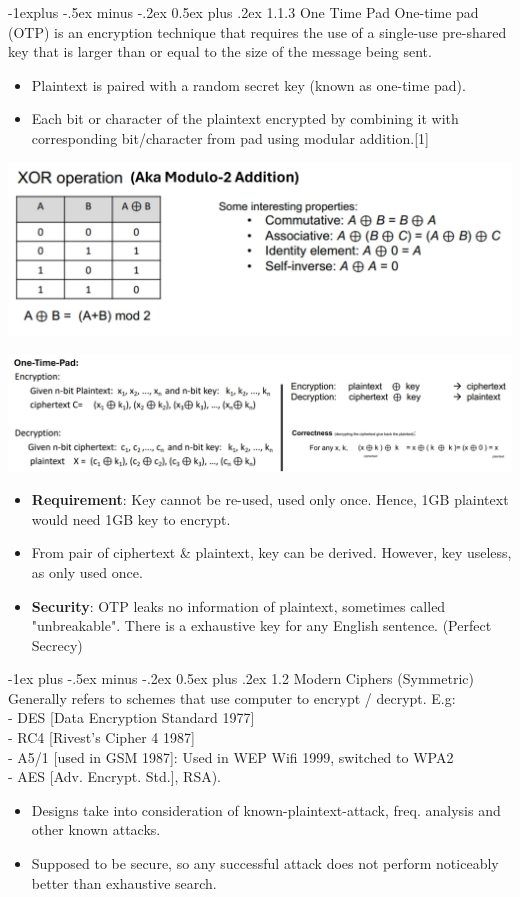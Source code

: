 \documentclass[10pt, landscape]{article}
\makeatletter
\renewcommand{\section}{\@startsection{section}{1}{0mm}%
                                {-1ex plus -.5ex minus -.2ex}%
                                {0.5ex plus .2ex}%
                                {\normalfont\large\bfseries}}
\renewcommand{\subsection}{\@startsection{subsection}{2}{0mm}%
                                {-1explus -.5ex minus -.2ex}%
                                {0.5ex plus .2ex}%
                                {\normalfont\normalsize\bfseries}}
\makeatother
\begin{document}
\begin{multicols*}{3}
\columnbreak

\subsection{1.1.3 One Time Pad}
One-time pad (OTP) is an encryption technique that requires the use of a single-use pre-shared key that is larger than or equal to the size of the message being sent. 
\begin{itemize}
\item Plaintext is paired with a random secret key (known as one-time pad). 
\item Each bit or character of the plaintext encrypted by combining it with corresponding bit/character from pad using modular addition.[1]
\end{itemize}
\centerline{\includegraphics[width=0.4\linewidth]{XOR}}
\centerline{\includegraphics[width=1\linewidth]{OTP}}
\begin{itemize}
\item \textbf{Requirement}: Key cannot be re-used, used only once. Hence, 1GB plaintext would need 1GB key to encrypt.
\item From pair of ciphertext \& plaintext, key can be derived. However, key useless, as only used once.
\item \textbf{Security}: OTP leaks no information of plaintext, sometimes called "unbreakable". There is a exhaustive key for any English sentence. (Perfect Secrecy)
\end{itemize}

\section{1.2 Modern Ciphers (Symmetric)}
Generally refers to schemes that use computer to encrypt / decrypt. E.g:
\\ - DES [Data Encryption Standard 1977] 
\\ - RC4 [Rivest's Cipher 4 1987]
\\ - A5/1 [used in GSM 1987]: Used in WEP Wifi 1999, switched to WPA2
\\ - AES [Adv. Encrypt. Std.], RSA).
\begin{itemize}
\item Designs take into consideration of known-plaintext-attack, freq. analysis and other known attacks.
\item Supposed to be secure, so any successful attack does not perform noticeably better than exhaustive search.
\end{itemize}


\end{multicols*}
\end{document}
